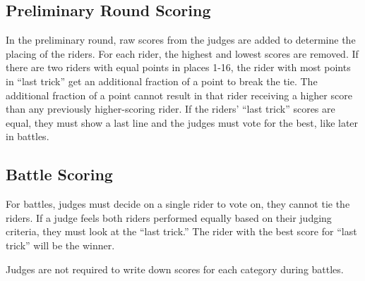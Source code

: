\subsection{Preliminary Round Scoring}
In the preliminary round, raw scores from the judges are added to determine the placing of the riders.
For each rider, the highest and lowest scores are removed. %
If there are two riders with equal points in places 1-16, the rider with most points in ``last trick'' get an additional fraction of a point to break the tie.
The additional fraction of a point cannot result in that rider receiving a higher score than any previously higher-scoring rider.
If the riders' ``last trick'' scores are equal, they must show a last line and the judges must vote for the best, like later in battles.

\subsection{Battle Scoring}
For battles, judges must decide on a single rider to vote on, they cannot tie the riders.
If a judge feels both riders performed equally based on their judging criteria, they must look at the ``last trick.''
The rider with the best score for ``last trick'' will be the winner.

Judges are not required to write down scores for each category during battles.
